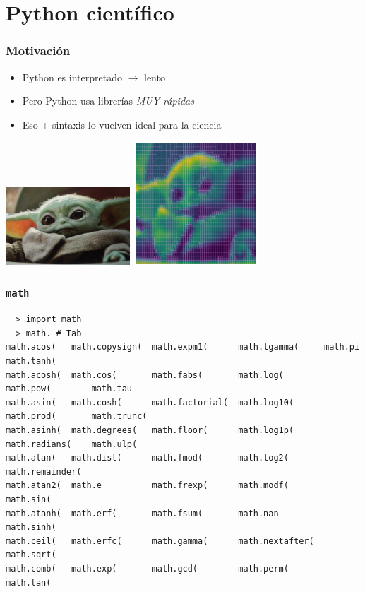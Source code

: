 \documentclass[14pt,aspectratio=169,xcolor=dvipsnames]{beamer}
\begin{document}
\section{Python científico}
\begin{frame}[fragile]\frametitle{Motivación}
    \begin{itemize}
        \item Python es interpretado $\to$ lento
        \item Pero Python usa librerías \emph{MUY rápidas}
        \item Eso + sintaxis lo vuelven ideal para la ciencia
    \end{itemize}
    \begin{center}
    \includegraphics[width=0.35\textwidth]{../images/baby-yoda-T.jpg} \hspace{1cm}\includegraphics[width=0.35\textwidth]{../images/baby-yoda-mesh.png}
    \end{center}
\end{frame}
\begin{frame}[fragile]\frametitle{\texttt{math}}
    \begin{verbatim}
  > import math
  > math. # Tab
math.acos(   math.copysign(  math.expm1(      math.lgamma(     math.pi          math.tanh(
math.acosh(  math.cos(       math.fabs(       math.log(        math.pow(        math.tau
math.asin(   math.cosh(      math.factorial(  math.log10(      math.prod(       math.trunc(
math.asinh(  math.degrees(   math.floor(      math.log1p(      math.radians(    math.ulp(
math.atan(   math.dist(      math.fmod(       math.log2(       math.remainder(  
math.atan2(  math.e          math.frexp(      math.modf(       math.sin(        
math.atanh(  math.erf(       math.fsum(       math.nan         math.sinh(       
math.ceil(   math.erfc(      math.gamma(      math.nextafter(  math.sqrt(       
math.comb(   math.exp(       math.gcd(        math.perm(       math.tan(  
    \end{verbatim}
    
\end{frame}
\end{document}
